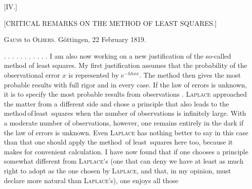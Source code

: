 \clearpage
{}
\begin{center}
[IV.]

{\large [CRITICAL REMARKS ON THE METHOD OF LEAST SQUARES.]}
\end{center}



\begin{center}
\textsc{Gauss} to \textsc{Olbers}. Göttingen, 22 February 1819.
\end{center}

\noindent . . . . . . . . . . . I am also now working on a new justification of the so-called method of least squares. My first justification assumes that the probability of the observational error $x$ is represented by $e^{-hhxx}$. The method then gives the most probable results with full rigor and in every case. If the law of errors is unknown, it is  to specify the most probable results from observations . \textsc{Laplace} approached the matter from a different side and chose a principle that also leads to the\,method\,of\,least\ squares when the number of observations is infinitely large. With a moderate number of observations, however, one remains entirely in the dark if the law of errors is unknown. Even \textsc{Laplace} has nothing better to say in this case than that one should apply the method\ of least\ squares here too, because it makes for convenient calculation. I have now found that if one chooses a principle somewhat different from \textsc{Laplace}'s (one that  can deny we have at least as much right to adopt as the one chosen by \textsc{Laplace}, and that, in my opinion,  must declare more natural than \textsc{Laplace}'s), one enjoys all those\space%
